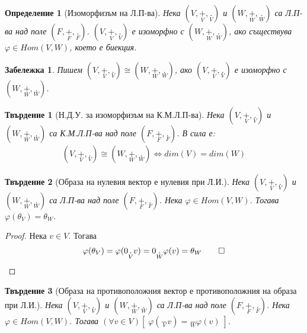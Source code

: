 \documentclass[12pt]{article}
\newtheorem{remark}{{Забележка}}%
\newtheorem{proposition}{Твърдение}%
\newtheorem{definition}{Определение}%
\begin{document}
\begin{definition}[Изоморфизъм на Л.П-ва]
Нека \((V, \underset{V}{+}, \underset{V}{.})\) и \((W, \underset{W}{+}, \underset{W}{.})\) са Л.П-ва над поле \((F, \underset{F}{+}, \underset{F}{.})\).
\((V, \underset{V}{+}, \underset{V}{.})\) е изоморфно с \((W, \underset{W}{+}, \underset{W}{.})\),
ако съществува \(\varphi \in Hom(V, W)\), което е биекция.
\end{definition}

\begin{remark}
Пишем \((V, \underset{V}{+}, \underset{V}{.}) \cong (W, \underset{W}{+}, \underset{W}{.})\), ако
\((V, \underset{V}{+}, \underset{V}{.})\) е изоморфно с \((W, \underset{W}{+}, \underset{W}{.})\).
\end{remark}

\begin{proposition}[Н.Д.У. за изоморфизъм на К.М.Л.П-ва]
Нека \((V, \underset{V}{+}, \underset{V}{.})\) и \((W, \underset{W}{+}, \underset{W}{.})\) са К.М.Л.П-ва над поле \((F, \underset{F}{+}, \underset{F}{.})\).
В сила е:
\begin{align*}
(V, \underset{V}{+}, \underset{V}{.}) \cong (W, \underset{W}{+}, \underset{W}{.}) \iff dim(V) = dim(W)
\end{align*}
\end{proposition}

\begin{proposition}[Образа на нулевия вектор е нулевия при Л.И.]
Нека \((V, \underset{V}{+}, \underset{V}{.})\) и \((W, \underset{W}{+}, \underset{W}{.})\) са Л.П-ва над поле \((F, \underset{F}{+}, \underset{F}{.})\).
Нека \(\varphi \in Hom(V, W)\). Тогава \(\varphi(\theta_V) = \theta_W\).
\end{proposition}

\begin{proof}
Нека \(v \in V\). Тогава
\begin{align*}
\varphi(\theta_V) = \varphi(0 \underset{V}{.} v ) = 0 \underset{W}{.} \varphi(v) = \theta_W \qed
\end{align*}
\end{proof}

\begin{proposition}[Образа на противоположния вектор е противоположния на образа при Л.И.]
Нека \((V, \underset{V}{+}, \underset{V}{.})\) и \((W, \underset{W}{+}, \underset{W}{.})\) са Л.П-ва над поле \((F, \underset{F}{+}, \underset{F}{.})\).
Нека \(\varphi \in Hom(V, W)\). Тогава \((\forall v \in V)[\; \varphi(\underset{V}{-}v) = \underset{W}{-}\varphi(v) \; ]\).
\end{proposition}
\end{document}
